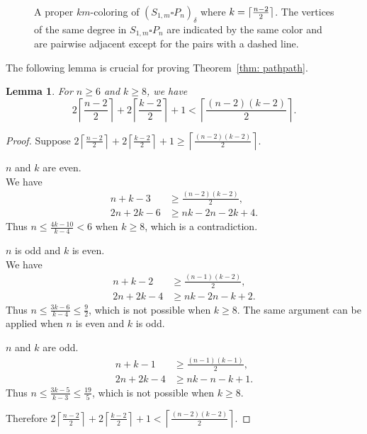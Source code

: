 \documentclass[12pt]{amsart}
\newtheorem{lemma}[theorem]{Lemma}
\DeclarePairedDelimiter{\ceil}{\lceil}{\rceil}
\begin{document}
\begin{figure}
    \caption{A proper $km$-coloring of $(S_{1,m}\square P_n)_\delta$ where $k = \ceil{\frac{n-2}{2}}$. The vertices of the same degree in $S_{1,m}\square P_n$ are indicated by the same color and are pairwise adjacent except for the pairs with a dashed line.}
    \label{fig:S1m-Pn}
\end{figure}

The following lemma is crucial for proving Theorem~\ref{thm: pathpath}.
\begin{lemma}\label{lem: bound}
For $n\geq 6$ and $k\geq 8$, we have 
\[
2\left\lceil\frac{n-2}{2}\right\rceil+2\left\lceil\frac{k-2}{2}\right\rceil+1<\left\lceil\frac{(n-2)(k-2)}{2}\right\rceil.
\]
\end{lemma}
\begin{proof}
Suppose $2\left\lceil\frac{n-2}{2}\right\rceil+2\left\lceil\frac{k-2}{2}\right\rceil+1\geq \left\lceil\frac{(n-2)(k-2)}{2}\right\rceil$.

{\case $n$ and $k$ are even.}\\
We have
\begin{align*}
    n+k-3     &\geq \frac{(n-2)(k-2)}{2},\\
    2n+2k-6 &\geq nk-2n-2k+4.
\end{align*}
Thus $n\leq \frac{4k-10}{k-4}<6$ when $k\geq 8$, which is a contradiction.

{\case $n$ is odd and $k$ is even.}\\
We have
\begin{align*}
    n+k-2     &\geq \frac{(n-1)(k-2)}{2},\\
    2n+2k-4 &\geq nk-2n-k+2.
\end{align*}
Thus $n\leq \frac{3k-6}{k-4}\leq \frac{9}{2}$, which is not possible when $k\geq 8$.
The same argument can be applied when $n$ is even and $k$ is odd.

{\case $n$ and $k$ are odd.}\\
\begin{align*}
    n+k-1     &\geq \frac{(n-1)(k-1)}{2},\\
    2n+2k-4 &\geq nk-n-k+1.
\end{align*}
Thus $n\leq \frac{3k-5}{k-3} \leq \frac{19}{5}$, which is not possible when $k\geq 8$.

Therefore $2\left\lceil\frac{n-2}{2}\right\rceil+2\left\lceil\frac{k-2}{2}\right\rceil+1<\left\lceil\frac{(n-2)(k-2)}{2}\right\rceil.$
\end{proof}
\end{document}

